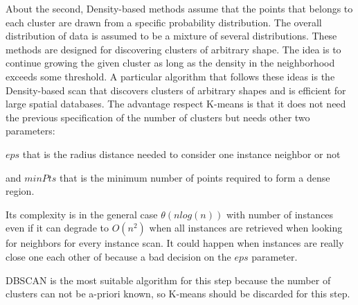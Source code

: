 About the second, Density-based methods assume that the points that belongs to
each cluster are
drawn from a specific probability distribution. The overall distribution of data
is assumed to be a mixture of several distributions. These methods are designed
for discovering clusters of arbitrary shape. The idea is to continue growing the
given cluster as long as the density in the neighborhood exceeds some threshold.
A particular algorithm that follows these ideas is the
Density-based scan that discovers clusters of arbitrary shapes and is efficient
for large spatial databases. The advantage respect K-means is that it does not
need the previous specification of the number of clusters but needs other two
parameters:
\begin{enumerate*}[label=\roman*)]
  \item $eps$ that is the radius distance needed to consider one instance neighbor
    or not 
  \item and $minPts$ that is the minimum number of points required to form a dense
    region.
\end{enumerate*}
Its complexity is in the general case $\theta(nlog(n))$ with number of instances
even if it can degrade to $O(n^{2})$ when all instances are retrieved when looking
for neighbors for every instance scan. It could happen when instances are really
close one each other of because a bad decision on the $eps$ parameter.

DBSCAN is the most suitable algorithm for this step because the number of clusters 
can not be a-priori known, so K-means should be discarded for this step.


